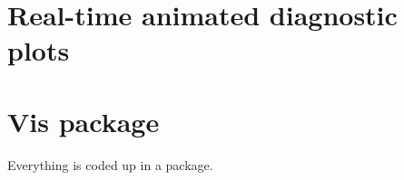 \documentclass[12pt]{article}
\newenvironment{Shaded}{\begin{snugshade}}{\end{snugshade}}
\newcommand{\DataTypeTok}[1]{\textcolor[rgb]{0.13,0.29,0.53}{#1}}
\newcommand{\KeywordTok}[1]{\textcolor[rgb]{0.13,0.29,0.53}{\textbf{#1}}}
\newcommand{\NormalTok}[1]{#1}
\newcommand{\OperatorTok}[1]{\textcolor[rgb]{0.81,0.36,0.00}{\textbf{#1}}}
\newcommand{\OtherTok}[1]{\textcolor[rgb]{0.56,0.35,0.01}{#1}}
\newcommand{\StringTok}[1]{\textcolor[rgb]{0.31,0.60,0.02}{#1}}
\begin{document}
\hypertarget{real-time-animated-diagnostic-plots}{%
\section{Real-time animated diagnostic
plots}\label{real-time-animated-diagnostic-plots}}

\begin{Shaded}
\end{Shaded}

\hypertarget{vis-package}{%
\section{Vis package}\label{vis-package}}

Everything is coded up in a package.

\clearpage



\end{document}
